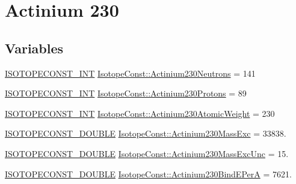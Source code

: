 \hypertarget{group___isotope_const-_actinium-_ac230}{}\section{Actinium 230}
\label{group___isotope_const-_actinium-_ac230}
\subsection*{Variables}
\begin{DoxyCompactItemize}
\item 
\mbox{\hyperlink{group___isotope_const-_macros_ga5f18360b3e99483a35c32d789e62621c}{I\+S\+O\+T\+O\+P\+E\+C\+O\+N\+S\+T\+\_\+\+I\+NT}} \mbox{\hyperlink{group___isotope_const-_actinium-_ac230_ga7d3bb99548c7df16cb7c3271fcae2ca0}{Isotope\+Const\+::\+Actinium230\+Neutrons}} = 141
\item 
\mbox{\hyperlink{group___isotope_const-_macros_ga5f18360b3e99483a35c32d789e62621c}{I\+S\+O\+T\+O\+P\+E\+C\+O\+N\+S\+T\+\_\+\+I\+NT}} \mbox{\hyperlink{group___isotope_const-_actinium-_ac230_ga924e8fcd477abd2f77f5e42aa779db6c}{Isotope\+Const\+::\+Actinium230\+Protons}} = 89
\item 
\mbox{\hyperlink{group___isotope_const-_macros_ga5f18360b3e99483a35c32d789e62621c}{I\+S\+O\+T\+O\+P\+E\+C\+O\+N\+S\+T\+\_\+\+I\+NT}} \mbox{\hyperlink{group___isotope_const-_actinium-_ac230_gacefb88f3a58e2f4603ffd24207326359}{Isotope\+Const\+::\+Actinium230\+Atomic\+Weight}} = 230
\item 
\mbox{\hyperlink{group___isotope_const-_macros_ga8f45a7272ce02c0b4c65c44636ed719a}{I\+S\+O\+T\+O\+P\+E\+C\+O\+N\+S\+T\+\_\+\+D\+O\+U\+B\+LE}} \mbox{\hyperlink{group___isotope_const-_actinium-_ac230_ga90cbf56524f4c7becbd623c8b442ccb6}{Isotope\+Const\+::\+Actinium230\+Mass\+Exc}} = 33838.
\item 
\mbox{\hyperlink{group___isotope_const-_macros_ga8f45a7272ce02c0b4c65c44636ed719a}{I\+S\+O\+T\+O\+P\+E\+C\+O\+N\+S\+T\+\_\+\+D\+O\+U\+B\+LE}} \mbox{\hyperlink{group___isotope_const-_actinium-_ac230_ga2c5a4a922bc5898b15ea022f514575d1}{Isotope\+Const\+::\+Actinium230\+Mass\+Exc\+Unc}} = 15.
\item 
\mbox{\hyperlink{group___isotope_const-_macros_ga8f45a7272ce02c0b4c65c44636ed719a}{I\+S\+O\+T\+O\+P\+E\+C\+O\+N\+S\+T\+\_\+\+D\+O\+U\+B\+LE}} \mbox{\hyperlink{group___isotope_const-_actinium-_ac230_ga4f3af793f8a938413f5f82b5574f2afd}{Isotope\+Const\+::\+Actinium230\+Bind\+E\+PerA}} = 7621.
\item 

\end{DoxyCompactItemize}
